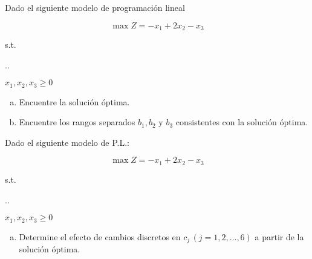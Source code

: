 \documentclass[spanish,letterpaper,11pt]{exam}
\author{Dr. Rafael Torres Escobar}
\begin{document}
\begin{questions}
    \question
    Dado el siguiente modelo de programación lineal

    \[ \max Z = -x_1 + 2x_2 - x_3 \]
  
{\centering
\vspace{2mm}
s.t.
\vspace{2mm}

%
\sysdelim..%

\vspace{3mm}
$x_1, x_2, x_3 \geq 0$
\par}
  
\begin{enumerate}[a)] 
\item Encuentre la solución óptima.
  
\item Encuentre los rangos separados $b_1, b_2 $ y $b_3$ consistentes con la solución óptima.
\end{enumerate}




  
\vspace{6mm}

  \question
  Dado el siguiente modelo de P.L.:

  \[ \max Z = -x_1 + 2x_2 - x_3 \]

  
{\centering
\vspace{2mm}
s.t.
\vspace{2mm}

%
\sysdelim..%

\vspace{3mm}

$x_1,x_2,x_3 \geq 0$
\par}


\begin{enumerate}[a)]
    \item Determine el efecto de cambios discretos en $c_j \, (j = 1,2,\ldots,6)$ a partir de la solución óptima.
\end{enumerate}

\end{questions}
\end{document}
